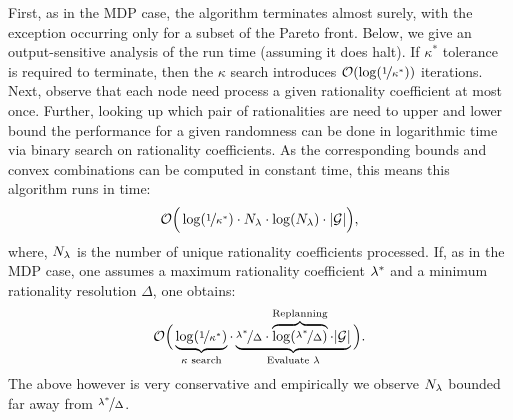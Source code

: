  First, as in the MDP case, the
algorithm terminates almost surely, with the exception occurring only
for a subset of the Pareto front.  Below, we give an output-sensitive
analysis of the run time (assuming it does halt).  If $\kappa^*$
tolerance is required to terminate, then the $\kappa$ search
introduces $\mathcal{O}(\log(\nicefrac{1}{\kappa^*}))$
iterations. Next, observe that each node need process a given rationality
coefficient at most once. Further, looking up which pair of rationalities
are need to upper and lower bound the performance for a given randomness
can be done in logarithmic time via binary search on rationality coefficients.
As the corresponding bounds and convex combinations can be computed in
constant time, this means this algorithm runs in time:
\begin{equation}
  \label{eq:sg-runtime}
  \mathcal{O}\Big(\log(\nicefrac{1}{\kappa^*})\cdot N_\rat\cdot \log(N_\rat)\cdot |\sg|\Big),
\end{equation}
where, $N_\lambda$ is the number of unique rationality coefficients
processed.  If, as in the MDP case, one assumes a maximum rationality
coefficient $\lambda^*$ and a minimum rationality resolution $\Delta$,
one obtains:
\begin{equation}
  \mathcal{O}\Big(\underbrace{\log(\nicefrac{1}{\kappa^*})}_{\kappa \text{ search}}\cdot \underbrace{\nicefrac{\lambda^*}{\Delta}\cdot \overbrace{\log(\nicefrac{\lambda^*}{\Delta})}^{\text{Replanning}}\cdot |\mathcal{G}|}_{\text{Evaluate } \lambda}\Big).
\end{equation}
The above however is very conservative and empirically we observe
$N_\lambda$ bounded far away from $\nicefrac{\lambda^*}{\Delta}$.



